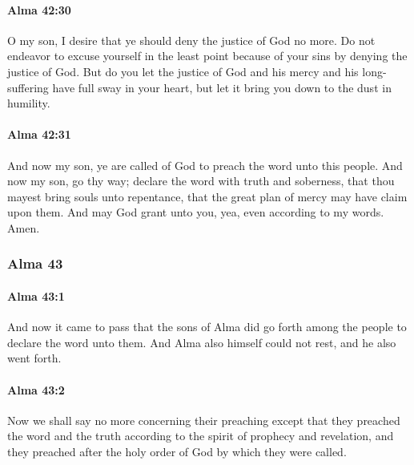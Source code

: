 		\paragraph{Alma 42:30} %
			\label{ALMA-42-30}

			O my son, I desire that ye should deny the justice of God no more.
			Do not endeavor to excuse yourself in the least point because of your sins
			by denying the justice of God.
			But do you let the justice of God and his mercy
			and his long-suffering have full sway in your heart,
			but let it bring you down to the dust in humility.

		\paragraph{Alma 42:31} %
			\label{ALMA-42-31}

			And now my son, ye are called of God to preach the word unto this people.
			And now my son, go thy way;
			declare the word with truth and soberness,
			that thou mayest bring souls unto repentance,
			that the great plan of mercy may have claim upon them.
			And may God grant unto you, yea, even according to my words.
			Amen.

	\subsubsection{Alma 43} %
		\label{ALMA-43}
		
		\paragraph{Alma 43:1} %
			\label{ALMA-43-1}

			And now it came to pass that
			the sons of Alma did go forth among the people to declare the word unto them.
			And Alma also himself could not rest, and he also went forth.

		\paragraph{Alma 43:2} %
			\label{ALMA-43-2}

			Now we shall say no more concerning their preaching
			except that they preached the word and the truth
			according to the spirit of prophecy and revelation,
			and they preached after the holy order of God by which they were called.

